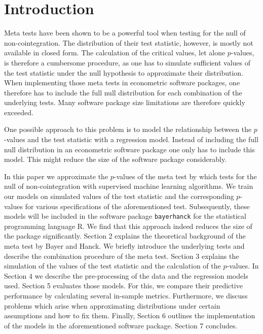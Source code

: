 \documentclass[12pt,a4paper]{article}
\begin{document}
\restoregeometry

\newpage
{} %

\hypertarget{introduction}{%
\section{Introduction}\label{introduction}}

Meta tests have been shown to be a powerful tool when testing for the
null of non-cointegration. The distribution of their test statistic,
however, is mostly not available in closed form. The calculation of the
critical values, let alone \(p\)-values, is therefore a cumbersome
procedure, as one has to simulate sufficient values of the test
statistic under the null hypothesis to approximate their distribution.
When implementing those meta tests in econometric software packages, one
therefore has to include the full null distribution for each combination
of the underlying tests. Many software package size limitations are
therefore quickly exceeded.

One possible approach to this problem is to model the relationship
between the \(p\)-values and the test statistic with a regression model.
Instead of including the full null distribution in an econometric
software package one only has to include this model. This might reduce
the size of the software package considerably.

In this paper we approximate the \(p\)-values of the meta test by
\textcite{Bayerhanck_2012} which tests for the null of non-cointegration
with supervised machine learning algorithms. We train our models on
simulated values of the test statistic and the corresponding
\(p\)-values for various specifications of the aforementioned test.
Subsequently, these models will be included in the software package
\texttt{bayerhanck} for the statistical programming language R. We find
that this approach indeed reduces the size of the package significantly.
Section 2 explains the theoretical background of the meta test by Bayer
and Hanck. We briefly introduce the underlying tests and describe the
combination procedure of the meta test. Section 3 explains the
simulation of the values of the test statistic and the calculation of
the \(p\)-values. In Section 4 we describe the pre-processing of the
data and the regression models used. Section 5 evaluates those models.
For this, we compare their predictive performance by calculating several
in-sample metrics. Furthermore, we discuss problems which arise when
approximating distributions under certain assumptions and how to fix
them. Finally, Section 6 outlines the implementation of the models in
the aforementioned software package. Section 7 concludes.
\end{document}
